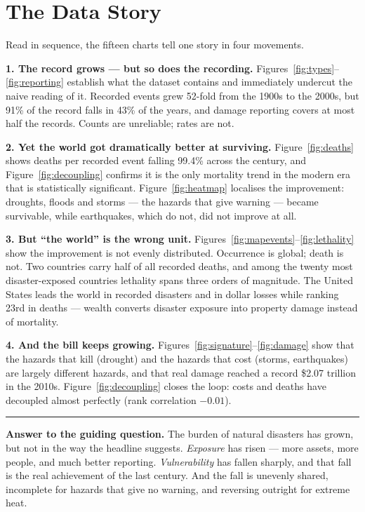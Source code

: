 \documentclass[11pt,a4paper]{article}
\newcommand{\callout}[1]{%
  \begin{center}\vspace{0.2em}
  \colorbox{bandgrey}{%
    \begin{minipage}{0.955\linewidth}
      \vspace{0.6em}
      {\color{inkblue}\rule{2.5pt}{1em}}\hspace{0.6em}%
      \begin{minipage}{0.93\linewidth}#1\end{minipage}
      \vspace{0.6em}
    \end{minipage}}
  \vspace{0.2em}\end{center}}
\begin{document}
\section{The Data Story}
\label{sec:story}

Read in sequence, the fifteen charts tell one story in four movements.

\textbf{1. The record grows --- but so does the recording.}
Figures~\ref{fig:types}--\ref{fig:reporting} establish what the dataset contains
and immediately undercut the naive reading of it. Recorded events grew 52-fold
from the 1900s to the 2000s, but 91\% of the record falls in 43\% of the years,
and damage reporting covers at most half the records. Counts are unreliable;
rates are not.

\textbf{2. Yet the world got dramatically better at surviving.}
Figure~\ref{fig:deaths} shows deaths per recorded event falling 99.4\% across the
century, and Figure~\ref{fig:decoupling} confirms it is the only mortality trend
in the modern era that is statistically significant. Figure~\ref{fig:heatmap}
localises the improvement: droughts, floods and storms --- the hazards that give
warning --- became survivable, while earthquakes, which do not, did not improve
at all.

\textbf{3. But ``the world'' is the wrong unit.}
Figures~\ref{fig:mapevents}--\ref{fig:lethality} show the improvement is not
evenly distributed. Occurrence is global; death is not. Two countries carry half
of all recorded deaths, and among the twenty most disaster-exposed countries
lethality spans three orders of magnitude. The United States leads the world in
recorded disasters and in dollar losses while ranking 23rd in deaths --- wealth
converts disaster exposure into property damage instead of mortality.

\textbf{4. And the bill keeps growing.}
Figures~\ref{fig:signature}--\ref{fig:damage} show that the hazards that kill
(drought) and the hazards that cost (storms, earthquakes) are largely different
hazards, and that real damage reached a record \$2.07 trillion in the 2010s.
Figure~\ref{fig:decoupling} closes the loop: costs and deaths have decoupled
almost perfectly (rank correlation $-0.01$).

\callout{\textbf{Answer to the guiding question.} The burden of natural disasters
has grown, but not in the way the headline suggests. \emph{Exposure} has risen
--- more assets, more people, and much better reporting. \emph{Vulnerability} has
fallen sharply, and that fall is the real achievement of the last century. And
the fall is unevenly shared, incomplete for hazards that give no warning, and
reversing outright for extreme heat.}
\end{document}
